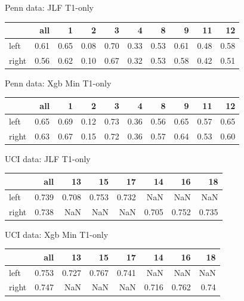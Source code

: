 \documentclass[ignorenonframetext,]{beamer}
\begin{document}
\begin{frame}{Penn data: JLF T1-only}

\begin{longtable}[c]{@{}lrrrrrrrrr@{}}
\toprule
& all & 1 & 2 & 3 & 4 & 8 & 9 & 11 & 12\tabularnewline
\midrule
\endhead
left & 0.61 & 0.65 & 0.08 & 0.70 & 0.33 & 0.53 & 0.61 & 0.48 &
0.58\tabularnewline
right & 0.56 & 0.62 & 0.10 & 0.67 & 0.32 & 0.53 & 0.58 & 0.42 &
0.51\tabularnewline
\bottomrule
\end{longtable}

\end{frame}

\begin{frame}{Penn data: Xgb Min T1-only}

\begin{longtable}[c]{@{}lrrrrrrrrr@{}}
\toprule
& all & 1 & 2 & 3 & 4 & 8 & 9 & 11 & 12\tabularnewline
\midrule
\endhead
left & 0.65 & 0.69 & 0.12 & 0.73 & 0.36 & 0.56 & 0.65 & 0.57 &
0.65\tabularnewline
right & 0.63 & 0.67 & 0.15 & 0.72 & 0.36 & 0.57 & 0.64 & 0.53 &
0.60\tabularnewline
\bottomrule
\end{longtable}

\end{frame}

\begin{frame}{UCI data: JLF T1-only}

\begin{longtable}[c]{@{}lrrrrrrr@{}}
\toprule
& all & 13 & 15 & 17 & 14 & 16 & 18\tabularnewline
\midrule
\endhead
left & 0.739 & 0.708 & 0.753 & 0.732 & NaN & NaN & NaN\tabularnewline
right & 0.738 & NaN & NaN & NaN & 0.705 & 0.752 & 0.735\tabularnewline
\bottomrule
\end{longtable}

\end{frame}

\begin{frame}{UCI data: Xgb Min T1-only}

\begin{longtable}[c]{@{}lrrrrrrr@{}}
\toprule
& all & 13 & 15 & 17 & 14 & 16 & 18\tabularnewline
\midrule
\endhead
left & 0.753 & 0.727 & 0.767 & 0.741 & NaN & NaN & NaN\tabularnewline
right & 0.747 & NaN & NaN & NaN & 0.716 & 0.762 & 0.74\tabularnewline
\bottomrule
\end{longtable}

\hypertarget{refs}{}

\end{frame}
\end{document}
